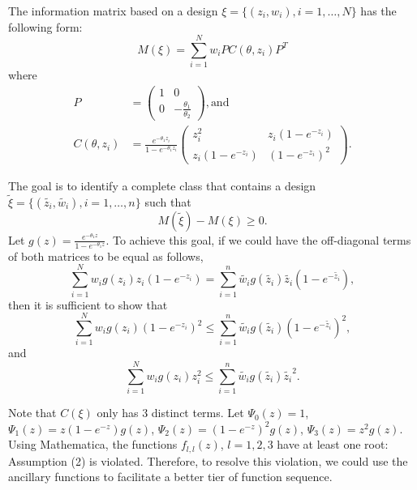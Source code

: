\documentclass[12pt]{amsart}
\theoremstyle{definition}
\theoremstyle{remark}
\numberwithin{equation}{section}
\begin{document}
 The information matrix based on a design $\xi = \{(z_i,w_i), i=1,\ldots,N\}$ has the following form: \begin{equation}
M(\xi) = \sum_{i=1}^{N} w_iP C(\theta,z_i)P^T 
\end{equation} where \begin{align*}
    P &= \left( \begin{array}{cc}
1 & 0\\
0 & -\frac{\theta_1}{\theta_2}
\end{array} \right), \text{and}\\ 
C(\theta,z_i) &= \frac{e^{-\theta_1z_i}}{1-e^{-\theta_1z_i}}\left( \begin{array}{cc}
z_i^2 & z_i(1-e^{-z_i})\\
z_i(1-e^{-z_i}) & (1-e^{-z_i})^2
\end{array} \right).
\end{align*} 

The goal is to identify a complete class that contains a design $\tilde{\xi} = \{(\tilde{z_i},\tilde{w_i}), i=1,\ldots,n\}$ such that \[M(\tilde{\xi})-M(\xi)\ge0.\] Let $g(z) = \frac{e^{-\theta_1z}}{1-e^{-\theta_1z}}$. To achieve this goal, if we could have the off-diagonal terms of both matrices to be equal as follows,
\begin{equation}\label{eq: beta2_eq1}
\sum_{i=1}^{N} w_i g(z_i)z_i(1-e^{-z_i}) = \sum_{i=1}^{n} \tilde{w_i}  g(\tilde{z_i}) \tilde{z_i}(1-e^{-\tilde{z_i}}),
\end{equation}
then it is sufficient to show that 
\begin{equation}\label{eq: beta2_eq2}
\sum_{i=1}^{N} w_i  g(z_i)(1-e^{-z_i})^2 \le \sum_{i=1}^{n} \tilde{w_i} g(\tilde{z_i}) (1-e^{-\tilde{z_i}})^2,
\end{equation}
and
\begin{equation}\label{eq: beta2_eq3}
\sum_{i=1}^{N} w_i g(z_i)z_i^2 \le \sum_{i=1}^{n} \tilde{w_i}g(\tilde{z_i})\tilde{z_i}^2.
\end{equation} 

Note that $C(\xi)$ only has 3 distinct terms. Let $\Psi_0(z) = 1$, $\Psi_1(z) = z(1-e^{-z})g(z)$, $\Psi_2(z) = (1-e^{-z})^2g(z)$, $\Psi_3(z) = z^2g(z)$. 
Using Mathematica, the functions $f_{l,l}(z)$, $l=1,2,3$ have at least one root: Assumption (2) is violated. Therefore, to resolve this violation, we could use the ancillary functions to facilitate a better tier of function sequence. 
\end{document}
